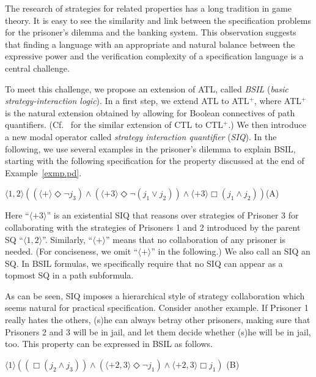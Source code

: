 \documentclass[11pt]{article}
\newcommand{\pfrr}{\Box}
\newcommand{\pevt}{\Diamond}
\begin{document}
The research of strategies for related properties has a long tradition in game theory.  
It is easy to 
see the similarity and link between the specification problems for the prisoner's dilemma and the banking system. 
This observation suggests that finding a language with an appropriate and natural 
balance between the expressive power and the verification complexity of a specification language is a central challenge.

To meet this challenge, we propose an extension of ATL,
called {\em BSIL} ({\em basic strategy-interaction logic}).
In a first step, we extend ATL to ATL$^+$, where ATL$^+$ is the natural extension obtained by allowing for Boolean connectives of path quantifiers.
(Cf.~\cite{BPM83,EC80} for the similar extension of CTL to CTL$^+$.)
We then introduce a new modal operator 
called {\em strategy interaction quantifier} ({\em SIQ}). 
In the following, we use several examples in the prisoner's dilemma 
to explain BSIL, starting with the following specification for the property discussed at the end of Example~\ref{exmp.pd}. 
\begin{center} 
\hfill $\langle 1,2\rangle((\langle+\rangle\pevt\neg j_3)\wedge 
	(\langle +3\rangle \pevt\neg (j_1\vee j_2))
	\wedge \langle+3\rangle \pfrr (j_1\wedge j_2))
$\hfill (A) 
\end{center} 
Here ``$\langle+3\rangle$'' is an existential SIQ that reasons over 
strategies of Prisoner 3 for collaborating with the strategies  
of Prisoners 1 and 2 introduced by the parent SQ ``$\langle 1,2\rangle$''. 
Similarly, ``$\langle+\rangle$'' means that 
no collaboration of any prisoner is needed. 
(For conciseness, we omit ``$\langle+\rangle$'' in the following.)  \label{reply1.null.siq1} 
We also call an SIQ an SQ.  
In BSIL formulas, we specifically require that no SIQ can appear 
as a topmost SQ in a path subformula.  

As can be seen, SIQ imposes a hierarchical style of strategy collaboration 
which seems natural for practical specification.  
Consider another example.  
If Prisoner 1 really hates the others, 
(s)he can always betray other prisoners,  
making sure that Prisoners 2 and 3 will be in jail, and let them 
decide whether (s)he will be in jail, too.  
This property can be expressed in BSIL as follows. 
\begin{center} 
\hfill 
$\langle 1\rangle((\pfrr (j_2\wedge j_3))\wedge 
	(\langle +2,3\rangle \pevt\neg j_1)
	\wedge \langle+2,3\rangle \pfrr j_1)
$
\hfill (B) 
\end{center} 
\end{document}
